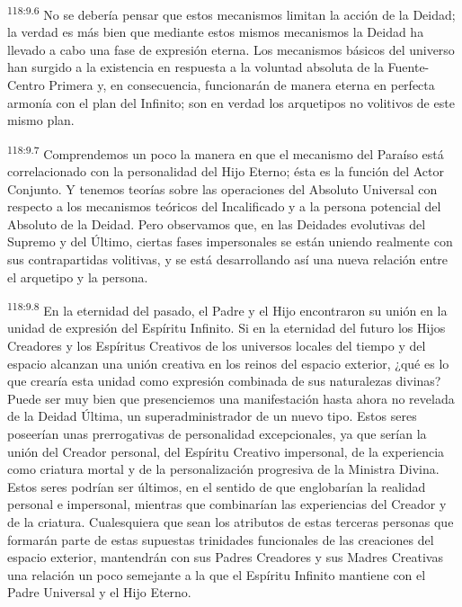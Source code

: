 \par
\textsuperscript{118:9.6} No se debería pensar que estos mecanismos limitan la acción de la Deidad; la verdad es más bien que mediante estos mismos mecanismos la Deidad ha llevado a cabo una fase de expresión eterna. Los mecanismos básicos del universo han surgido a la existencia en respuesta a la voluntad absoluta de la Fuente-Centro Primera y, en consecuencia, funcionarán de manera eterna en perfecta armonía con el plan del Infinito; son en verdad los arquetipos no volitivos de este mismo plan.

\par
\textsuperscript{118:9.7} Comprendemos un poco la manera en que el mecanismo del Paraíso está correlacionado con la personalidad del Hijo Eterno; ésta es la función del Actor Conjunto. Y tenemos teorías sobre las operaciones del Absoluto Universal con respecto a los mecanismos teóricos del Incalificado y a la persona potencial del Absoluto de la Deidad. Pero observamos que, en las Deidades evolutivas del Supremo y del Último, ciertas fases impersonales se están uniendo realmente con sus contrapartidas volitivas, y se está desarrollando así una nueva relación entre el arquetipo y la persona.

\par
\textsuperscript{118:9.8} En la eternidad del pasado, el Padre y el Hijo encontraron su unión en la unidad de expresión del Espíritu Infinito. Si en la eternidad del futuro los Hijos Creadores y los Espíritus Creativos de los universos locales del tiempo y del espacio alcanzan una unión creativa en los reinos del espacio exterior, ¿qué es lo que crearía esta unidad como expresión combinada de sus naturalezas divinas? Puede ser muy bien que presenciemos una manifestación hasta ahora no revelada de la Deidad Última, un superadministrador de un nuevo tipo. Estos seres poseerían unas prerrogativas de personalidad excepcionales, ya que serían la unión del Creador personal, del Espíritu Creativo impersonal, de la experiencia como criatura mortal y de la personalización progresiva de la Ministra Divina. Estos seres podrían ser últimos, en el sentido de que englobarían la realidad personal e impersonal, mientras que combinarían las experiencias del Creador y de la criatura. Cualesquiera que sean los atributos de estas terceras personas que formarán parte de estas supuestas trinidades funcionales de las creaciones del espacio exterior, mantendrán con sus Padres Creadores y sus Madres Creativas una relación un poco semejante a la que el Espíritu Infinito mantiene con el Padre Universal y el Hijo Eterno.

